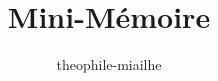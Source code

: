 \documentclass[a4paper, twoside, 12pt]{book}
\title{Mini-Mémoire}
\author{theophile-miailhe}
\begin{document}
\frontmatter



\mainmatter









\backmatter

\newpage
\nocite{*}
\printbibliography

%

\listoffigures

\tableofcontents
\end{document}
